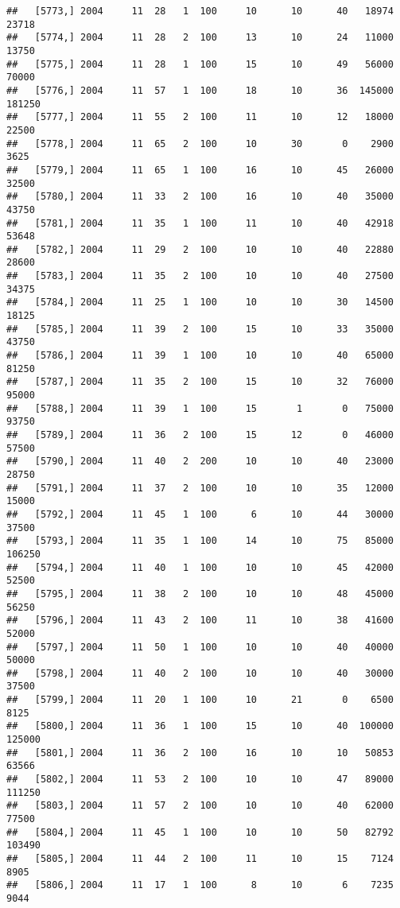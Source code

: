 \documentclass{article}\usepackage[]{graphicx}\usepackage[]{color}
\makeatletter
\newenvironment{kframe}{%
 \def\at@end@of@kframe{}%
 \ifinner\ifhmode%
  \def\at@end@of@kframe{\end{minipage}}%
  \begin{minipage}{\columnwidth}%
 \fi\fi%
 \def\FrameCommand##1{\hskip\@totalleftmargin \hskip-\fboxsep
 \colorbox{shadecolor}{##1}\hskip-\fboxsep
     \hskip-\linewidth \hskip-\@totalleftmargin \hskip\columnwidth}%
 \MakeFramed {\advance\hsize-\width
   \@totalleftmargin\z@ \linewidth\hsize
   \@setminipage}}%
 {\par\unskip\endMakeFramed%
 \at@end@of@kframe}
\newenvironment{knitrout}{}{} %
\makeatother
\begin{document}
\begin{knitrout}
\begin{kframe}
\begin{verbatim}
##   [5773,] 2004     11  28   1  100     10      10      40   18974   23718
##   [5774,] 2004     11  28   2  100     13      10      24   11000   13750
##   [5775,] 2004     11  28   1  100     15      10      49   56000   70000
##   [5776,] 2004     11  57   1  100     18      10      36  145000  181250
##   [5777,] 2004     11  55   2  100     11      10      12   18000   22500
##   [5778,] 2004     11  65   2  100     10      30       0    2900    3625
##   [5779,] 2004     11  65   1  100     16      10      45   26000   32500
##   [5780,] 2004     11  33   2  100     16      10      40   35000   43750
##   [5781,] 2004     11  35   1  100     11      10      40   42918   53648
##   [5782,] 2004     11  29   2  100     10      10      40   22880   28600
##   [5783,] 2004     11  35   2  100     10      10      40   27500   34375
##   [5784,] 2004     11  25   1  100     10      10      30   14500   18125
##   [5785,] 2004     11  39   2  100     15      10      33   35000   43750
##   [5786,] 2004     11  39   1  100     10      10      40   65000   81250
##   [5787,] 2004     11  35   2  100     15      10      32   76000   95000
##   [5788,] 2004     11  39   1  100     15       1       0   75000   93750
##   [5789,] 2004     11  36   2  100     15      12       0   46000   57500
##   [5790,] 2004     11  40   2  200     10      10      40   23000   28750
##   [5791,] 2004     11  37   2  100     10      10      35   12000   15000
##   [5792,] 2004     11  45   1  100      6      10      44   30000   37500
##   [5793,] 2004     11  35   1  100     14      10      75   85000  106250
##   [5794,] 2004     11  40   1  100     10      10      45   42000   52500
##   [5795,] 2004     11  38   2  100     10      10      48   45000   56250
##   [5796,] 2004     11  43   2  100     11      10      38   41600   52000
##   [5797,] 2004     11  50   1  100     10      10      40   40000   50000
##   [5798,] 2004     11  40   2  100     10      10      40   30000   37500
##   [5799,] 2004     11  20   1  100     10      21       0    6500    8125
##   [5800,] 2004     11  36   1  100     15      10      40  100000  125000
##   [5801,] 2004     11  36   2  100     16      10      10   50853   63566
##   [5802,] 2004     11  53   2  100     10      10      47   89000  111250
##   [5803,] 2004     11  57   2  100     10      10      40   62000   77500
##   [5804,] 2004     11  45   1  100     10      10      50   82792  103490
##   [5805,] 2004     11  44   2  100     11      10      15    7124    8905
##   [5806,] 2004     11  17   1  100      8      10       6    7235    9044

\end{verbatim}
\end{kframe}
\end{knitrout}
\end{document}
